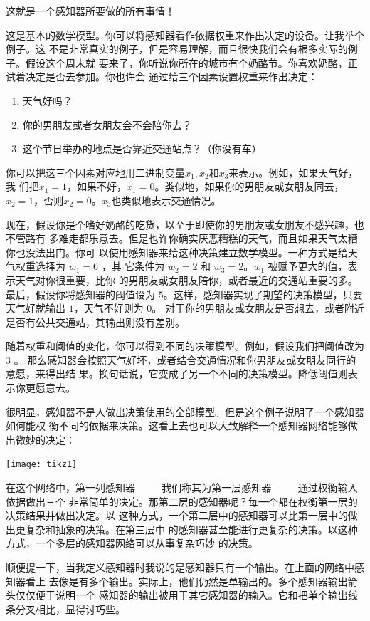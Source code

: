 这就是一个感知器所要做的所有事情！

这是基本的数学模型。你可以将感知器看作依据权重来作出决定的设备。让我举个例子。这
不是非常真实的例子，但是容易理解，而且很快我们会有根多实际的例子。假设这个周末就
要来了，你听说你所在的城市有个奶酪节。你喜欢奶酪，正试着决定是否去参加。你也许会
通过给三个因素设置权重来作出决定：
\begin{enumerate}
\item 天气好吗？
\item 你的男朋友或者女朋友会不会陪你去？
\item 这个节日举办的地点是否靠近交通站点？（你没有车）
\end{enumerate}

你可以把这三个因素对应地用二进制变量$x_1,x_2$和$x_3$来表示。例如，如果天气好，我
们把$x_1 = 1$，如果不好，$x_1 = 0$。类似地，如果你的男朋友或女朋友同去，$x_2 =
1$，否则$x_2 = 0$。$x_3$也类似地表示交通情况。

现在，假设你是个嗜好奶酪的吃货，以至于即使你的男朋友或女朋友不感兴趣，也不管路有
多难走都乐意去。但是也许你确实厌恶糟糕的天气，而且如果天气太糟你也没法出门。你可
以使用感知器来给这种决策建立数学模型。一种方式是给天气权重选择为 $w_1 = 6$ ，其
它条件为 $w_2 = 2$ 和 $w_3 = 2$。$w_1$ 被赋予更大的值，表示天气对你很重要，比你
的男朋友或女朋友陪你，或者最近的交通站重要的多。最后，假设你将感知器的阈值设为
$5$。这样，感知器实现了期望的决策模型，只要天气好就输出 $1$，天气不好则为 $0$。
对于你的男朋友或女朋友是否想去，或者附近是否有公共交通站，其输出则没有差别。

随着权重和阈值的变化，你可以得到不同的决策模型。例如，假设我们把阈值改为 $3$ 。
那么感知器会按照天气好坏，或者结合交通情况和你男朋友或女朋友同行的意愿，来得出结
果。换句话说，它变成了另一个不同的决策模型。降低阈值则表示你更愿意去。

很明显，感知器不是人做出决策使用的全部模型。但是这个例子说明了一个感知器如何能权
衡不同的依据来决策。这看上去也可以大致解释一个感知器网络能够做出微妙的决定：
\begin{center}
  \texttt{[image: tikz1]}
\end{center}

在这个网络中，第一列感知器 —— 我们称其为第一层感知器 —— 通过权衡输入依据做出三个
非常简单的决定。那第二层的感知器呢？每一个都在权衡第一层的决策结果并做出决定。以
这种方式，一个第二层中的感知器可以比第一层中的做出更复杂和抽象的决策。在第三层中
的感知器甚至能进行更复杂的决策。以这种方式，一个多层的感知器网络可以从事复杂巧妙
的决策。

顺便提一下，当我定义感知器时我说的是感知器只有一个输出。在上面的网络中感知器看上
去像是有多个输出。实际上，他们仍然是单输出的。多个感知器输出箭头仅仅便于说明一个
感知器的输出被用于其它感知器的输入。它和把单个输出线条分叉相比，显得讨巧些。

